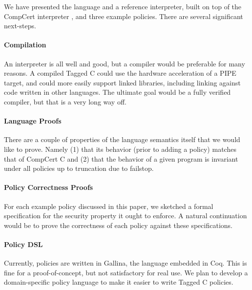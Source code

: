 \documentclass{llncs}
\begin{document}
\begin{table}[t]
We have presented the language and a reference interpreter, built on top of the CompCert interpreter
\cite{Leroy09:CompCert}, and three example policies. There are several significant next-steps.

\paragraph{Compilation}

An interpreter is all well and good, but a compiler would be preferable for many reasons.
A compiled Tagged C could use the hardware acceleration of a PIPE target, and could more easily
support linked libraries, including linking against code written in other languages.
The ultimate goal would be a fully verified compiler, but that is a very long way off.


\paragraph{Language Proofs}

There are a couple of properties of the language semantics itself that we would like to prove.
Namely (1) that its behavior (prior to adding a policy) matches that of CompCert C and
(2) that the behavior of a given program is invariant under all policies up to truncation due
to failstop.

\paragraph{Policy Correctness Proofs}

For each example policy discussed in this paper, we sketched a formal specification for the
security property it ought to enforce. A natural continuation would be to prove the correctness
of each policy against these specifications.

\paragraph{Policy DSL}

Currently, policies are written in Gallina, the language embedded in Coq. This is fine for a
proof-of-concept, but not satisfactory for real use. We plan to develop a domain-specific policy
language to make it easier to write Tagged C policies.




\appendix


\end{table}
\end{document}
